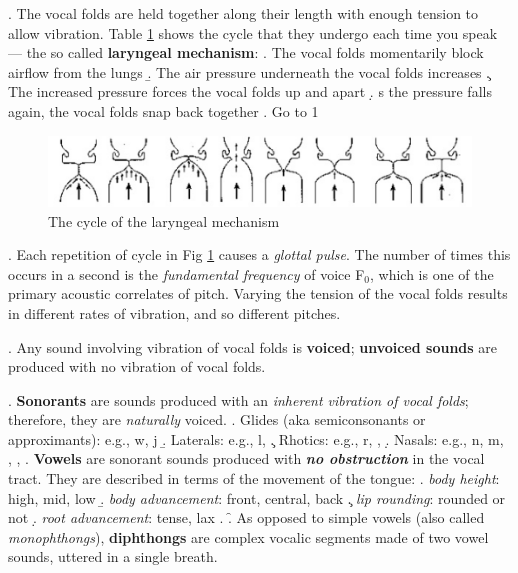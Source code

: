 \documentclass[11pt, oneside]{article}   	%
\begin{document}
\ex. The vocal folds are held together along their length with enough tension to allow vibration. Table \ref{fig: laryngeal} shows the cycle that they undergo each time you speak --- the so called {\bfseries laryngeal mechanism}:
\a. The vocal folds momentarily block airflow from the lungs
\b. The air pressure underneath the vocal folds increases
\c. The increased pressure forces the vocal folds up and apart 
\d. s the pressure falls again, the vocal folds snap back together 
\e. Go to 1

\begin{figure}[h!]
\caption{The cycle of the laryngeal mechanism}
\label{fig: laryngeal}
\centering
\includegraphics{laryngeal_m.png}
\end{figure}

\ex. Each repetition of cycle in Fig \ref{fig: laryngeal} causes a {\itshape glottal pulse}. The number of times this occurs in a second is the {\itshape fundamental frequency} of voice F$_{0}$, which is one of the primary acoustic correlates of pitch. Varying the tension of the vocal folds results in different rates of vibration, and so different pitches.

\ex. Any sound involving vibration of vocal folds is {\bfseries voiced}; {\bfseries unvoiced sounds} are produced with no vibration of vocal folds.

\ex. {\bfseries Sonorants} are sounds produced with an {\itshape inherent vibration of vocal folds}; therefore, they are {\itshape naturally} voiced.
\a. Glides (aka semiconsonants or approximants): e.g., w, j
\b. Laterals: e.g., l, 
\c. Rhotics: e.g., r, , 
\d. Nasals: e.g., n, m, , \textltailn, 
\e. {\bfseries Vowels} are sonorant sounds produced with {\itshape \bfseries no obstruction} in the vocal tract. They are described in terms of the movement of the tongue:
	\a. {\itshape body height}: high, mid, low
	\b. {\itshape body advancement}: front, central, back
	\c. {\itshape lip rounding}: rounded or not
	\d. {\itshape root advancement}: tense, lax
	\z.
\f. As opposed to simple vowels (also called {\itshape monophthongs}), {\bfseries diphthongs} are complex vocalic segments made of two vowel sounds, uttered in a single breath.
\end{document}
